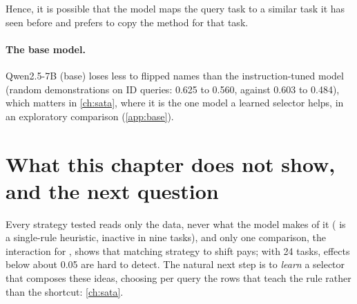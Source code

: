 Hence, it is possible that the model maps the query task to a similar task it has seen before and prefers to copy the method for that task.

\paragraph{The base model.}
Qwen2.5-7B (base) loses less to flipped names than the instruction-tuned model (random demonstrations on ID queries: 0.625 to 0.560, against 0.603 to 0.484), which matters in \autoref{ch:sata}, where it is the one model a learned selector helps, in an exploratory comparison (\autoref{app:base}).

\newpage
\section{What this chapter does not show, and the next question}

Every strategy tested reads only the data, never what the model makes of it ( is a single-rule heuristic, inactive in nine tasks), and only one comparison, the interaction for , shows that matching strategy to shift pays; with 24 tasks, effects below about 0.05 \AUROC are hard to detect.
The natural next step is to \emph{learn} a selector that composes these ideas, choosing per query the rows that teach the rule rather than the shortcut: \autoref{ch:sata}.
